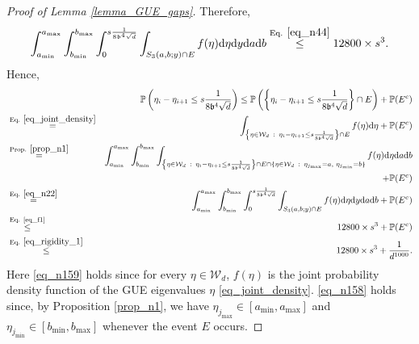 \documentclass[11pt,letterpaper]{article}
\begin{document}
\begin{proof}[Proof of Lemma \ref{lemma_GUE_gaps}]
%
Therefore,
%
\begin{equation}\label{eq_f1}
 \int_{a_{\min}}^{a_{\max}} \int_{b_{\min}}^{b_{\max}} \int_0^{s\frac{1}{8\mathfrak{b}^4\sqrt{d}}} \int_{S_3(a,b;y) \cap E}  f(\eta) \mathrm{d} \eta \mathrm{d}y \mathrm{d} a \mathrm{d} b \stackrel{\textrm{Eq. } \eqref{eq_n44}}{\leq} 12800 \times s^3.
\end{equation}
%
Hence,
%
\begin{eqnarray}\label{eq_n46}
   & &\!\!\!\!\!\!\!\!\!\!\!\!\!\!\!\!\!\!\!\!\!\!\!\!\!\!\!\!\!\! \mathbb{P}\left(\eta_i - \eta_{i+1} \leq s\frac{1}{8\mathfrak{b}^4\sqrt{d} }\right) 
    \leq \mathbb{P}\left(\left\{\eta_i - \eta_{i+1} \leq  s\frac{1}{8\mathfrak{b}^4\sqrt{d} }\right\} \cap E\right)+ \mathbb{P}(E^c)\nonumber\\
        &\stackrel{\textrm{Eq. } \eqref{eq_joint_density}}{=}& \int_{\left \{\eta \in \mathcal{W}_d \, \, \, : \, \, \,\eta_i - \eta_{i+1} \leq  s\frac{1}{8\mathfrak{b}^4\sqrt{d} } \right\} \cap E} f(\eta) \mathrm{d} \eta + \mathbb{P}(E^c)\label{eq_n159}\\
%
&\stackrel{\textrm{Prop. } \ref{prop_n1}}{=} & \int_{a_{\min}}^{a_{\max}} \int_{b_{\min}}^{b_{\max}} \int_{\left \{\eta \in \mathcal{W}_d \, \, \, : \, \, \,\eta_i - \eta_{i+1} \leq  s\frac{1}{8\mathfrak{b}^4\sqrt{d} } \right\} \cap E \cap \{\eta \in \mathcal{W}_d \, \, \, : \, \, \, \eta_{j_{\mathrm{max}}} = a, \, \, \eta_{j_{\mathrm{min}}} = b\}} f(\eta) \mathrm{d} \eta \mathrm{d} a \mathrm{d} b\nonumber\\
%
& & + \mathbb{P}(E^c) \label{eq_n158}\\
    &\stackrel{\textrm{Eq. } \eqref{eq_n22}}{=}&\int_{a_{\min}}^{a_{\max}} \int_{b_{\min}}^{b_{\max}} \int_0^{s\frac{1}{8\mathfrak{b}^4\sqrt{d}}} \int_{S_3(a,b;y) \cap E} f(\eta) \mathrm{d} \eta \mathrm{d}y \mathrm{d} a \mathrm{d} b + \mathbb{P}(E^c)\nonumber\\
    &\stackrel{\textrm{Eq. \eqref{eq_f1}}}{\leq}&  12800\times s^3 + \mathbb{P}(E^c) \nonumber\\
        &\stackrel{\textrm{Eq. } \eqref{eq_rigidity_1}}{\leq}& 12800 \times s^3 + \frac{1}{d^{1000}}.
\end{eqnarray}
%
 Here \eqref{eq_n159} holds since for every $\eta \in \mathcal{W}_d$, $f(\eta)$ is the joint probability density function of the GUE eigenvalues $\eta$ \eqref{eq_joint_density}.
%
 \eqref{eq_n158} holds since, by Proposition \ref{prop_n1}, we have $ \eta_{j_{\mathrm{max}}}  \in[a_{\mathrm{min}}, a_{\mathrm{max}}]$ and  $ \eta_{j_{\mathrm{min}}}  \in[b_{\mathrm{min}}, b_{\mathrm{max}}]$ whenever the event $E$ occurs.
%


\end{proof}
\end{document}
